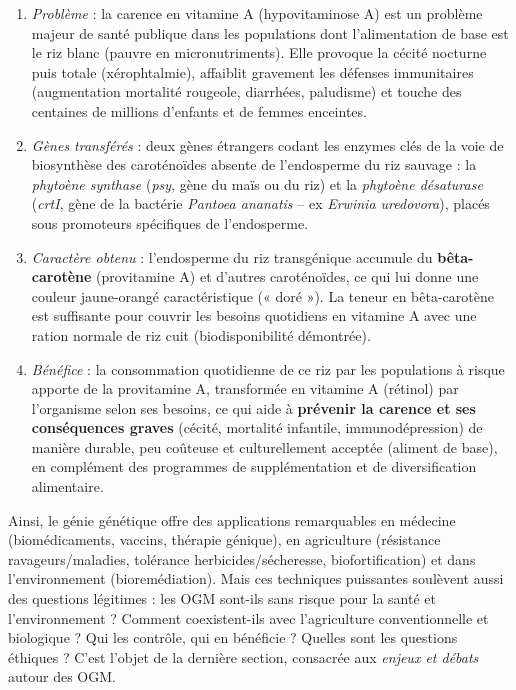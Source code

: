 \documentclass[11pt]{article}
\begin{document}
\begin{corrige}
\begin{enumerate}
\item \emph{Problème} : la carence en vitamine A (hypovitaminose A) est un problème majeur de santé publique dans les populations dont l'alimentation de base est le riz blanc (pauvre en micronutriments). Elle provoque la cécité nocturne puis totale (xérophtalmie), affaiblit gravement les défenses immunitaires (augmentation mortalité rougeole, diarrhées, paludisme) et touche des centaines de millions d'enfants et de femmes enceintes.
\item \emph{Gènes transférés} : deux gènes étrangers codant les enzymes clés de la voie de biosynthèse des caroténoïdes absente de l'endosperme du riz sauvage : la \emph{phytoène synthase} (\emph{psy}, gène du maïs ou du riz) et la \emph{phytoène désaturase} (\emph{crtI}, gène de la bactérie \emph{Pantoea ananatis} -- ex \emph{Erwinia uredovora}), placés sous promoteurs spécifiques de l'endosperme.
\item \emph{Caractère obtenu} : l'endosperme du riz transgénique accumule du \textbf{bêta-carotène} (provitamine A) et d'autres caroténoïdes, ce qui lui donne une couleur jaune-orangé caractéristique (« doré »). La teneur en bêta-carotène est suffisante pour couvrir les besoins quotidiens en vitamine A avec une ration normale de riz cuit (biodisponibilité démontrée).
\item \emph{Bénéfice} : la consommation quotidienne de ce riz par les populations à risque apporte de la provitamine A, transformée en vitamine A (rétinol) par l'organisme selon ses besoins, ce qui aide à \textbf{prévenir la carence et ses conséquences graves} (cécité, mortalité infantile, immunodépression) de manière durable, peu coûteuse et culturellement acceptée (aliment de base), en complément des programmes de supplémentation et de diversification alimentaire.
\end{enumerate}
\end{corrige}

Ainsi, le génie génétique offre des applications remarquables en médecine (biomédicaments, vaccins, thérapie génique), en agriculture (résistance ravageurs/maladies, tolérance herbicides/sécheresse, biofortification) et dans l'environnement (bioremédiation). Mais ces techniques puissantes soulèvent aussi des questions légitimes : les OGM sont-ils sans risque pour la santé et l'environnement ? Comment coexistent-ils avec l'agriculture conventionnelle et biologique ? Qui les contrôle, qui en bénéficie ? Quelles sont les questions éthiques ? C'est l'objet de la dernière section, consacrée aux \emph{enjeux et débats} autour des OGM.
\end{document}
